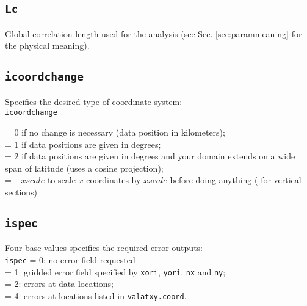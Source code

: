 \subsection{\texttt{Lc}}

Global correlation length used for the analysis (see Sec. \ref{sec:parammeaning} for the physical meaning).

\subsection{\texttt{icoordchange}\label{sec:icoord}}


Specifies the desired type of coordinate system:\\

\texttt{icoordchange} \begin{minipage}[t]{.7\textwidth} = $0$ if no change is necessary (data position in kilometers);\\
                                                        = $1$ if data positions are given in degrees;\\
                                                        = $2$ if data positions are given in degrees and your domain extends on a wide span of latitude                                                           (uses a cosine projection);\\
                                                        = $-xscale$ to scale $x$ coordinates by $xscale$ before doing anything ( for vertical                                                              sections)
                      \end{minipage}
                      
                      
\subsection{\texttt{ispec}}

Four base-values specifies the required error outputs:\\

\texttt{ispec}       = 0\qquad: no error field requested\\
  = 1\qquad: gridded error field specified by \texttt{xori}, \texttt{yori}, \texttt{nx} and \texttt{ny}; \\
  = 2\qquad: errors at data locations;\\
  = 4\qquad: errors at locations listed in \texttt{valatxy.coord}.

